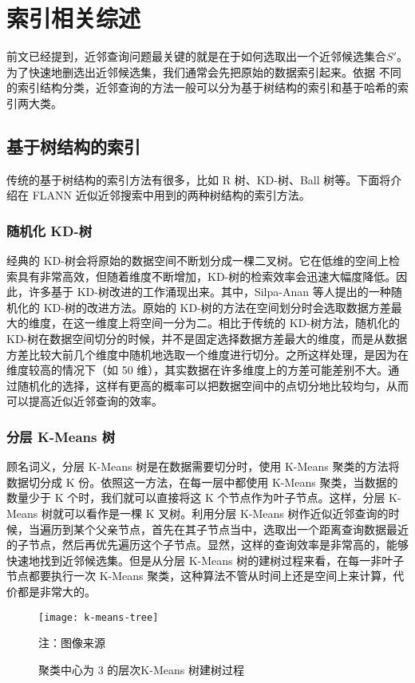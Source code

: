 

\chapter{索引相关综述}
\label{cha:related-work}
前文已经提到，近邻查询问题最关键的就是在于如何选取出一个近邻候选集合$S'$。为了快速地删选出近邻候选集，我们通常会先把原始的数据索引起来。依据
不同的索引结构分类，近邻查询的方法一般可以分为基于树结构的索引和基于哈希的索引两大类。
\section{基于树结构的索引}
传统的基于树结构的索引方法有很多，比如 R 树、KD-树、Ball 树等。下面将介绍在 FLANN\cite{muja_flann_2009} 近似近邻搜索中用到的两种树结构的索引方法。
\subsection{随机化 KD-树}
经典的 KD-树会将原始的数据空间不断划分成一棵二叉树。它在低维的空间上检索具有非常高效，但随着维度不断增加，KD-树的检索效率会迅速大幅度降低。因此，许多基于 KD-树改进的工作涌现出来。其中，Silpa-Anan 等人提出的一种随机化的 KD-树\cite{Silpa-AnanH08}的改进方法。原始的 KD-树的方法在空间划分时会选取数据方差最大的维度，在这一维度上将空间一分为二。相比于传统的 KD-树方法，随机化的 KD-树在数据空间切分的时候，并不是固定选择数据方差最大的维度，而是从数据方差比较大前几个维度中随机地选取一个维度进行切分。之所这样处理，是因为在维度较高的情况下（如 50 维），其实数据在许多维度上的方差可能差别不大。通过随机化的选择，这样有更高的概率可以把数据空间中的点切分地比较均匀，从而可以提高近似近邻查询的效率。
\subsection{分层 K-Means 树}
顾名词义，分层 K-Means 树\cite{Nister:2006}是在数据需要切分时，使用 K-Means 聚类的方法将数据切分成 K 份。依照这一方法，在每一层中都使用 K-Means 聚类，当数据的数量少于 K 个时，我们就可以直接将这 K 个节点作为叶子节点。这样，分层 K-Means 树就可以看作是一棵 K 叉树。利用分层 K-Means 树作近似近邻查询的时候，当遍历到某个父亲节点，首先在其子节点当中，选取出一个距离查询数据最近的子节点，然后再优先遍历这个子节点。显然，这样的查询效率是非常高的，能够快速地找到近邻候选集。但是从分层 K-Means 树的建树过程来看，在每一非叶子节点都要执行一次 K-Means 聚类，这种算法不管从时间上还是空间上来计算，代价都是非常大的。
\begin{figure}[H]
  \centering
  \texttt{[image: k-means-tree]}
  \caption{聚类中心为 3 的层次K-Means 树建树过程}
  \label{fig:k-means-tree}
  \footnotesize 注：图像来源\cite{Nister:2006}
\end{figure}
